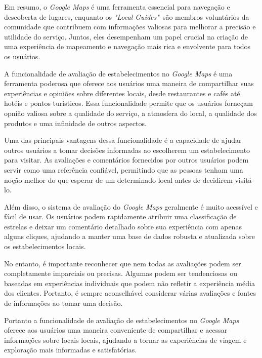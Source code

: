 Em resumo, o \textit{Google Maps} é uma ferramenta essencial para navegação e descoberta de lugares, enquanto os \textit{"Local Guides"}~são membros voluntários da comunidade que contribuem com informações valiosas para melhorar a precisão e utilidade do serviço. Juntos, eles desempenham um papel crucial na criação de uma experiência de mapeamento e navegação mais rica e envolvente para todos os usuários.



A funcionalidade de avaliação de estabelecimentos no \textit{Google Maps} é uma ferramenta poderosa que oferece aos usuários uma maneira de compartilhar suas experiências e opiniões sobre diferentes locais, desde restaurantes e cafés até hotéis e pontos turísticos. Essa funcionalidade permite que os usuários forneçam opnião valiosa sobre a qualidade do serviço, a atmosfera do local, a qualidade dos produtos e uma infinidade de outros aspectos.

Uma das principais vantagens dessa funcionalidade é a capacidade de ajudar outros usuários a tomar decisões informadas ao escolherem um estabelecimento para visitar. As avaliações e comentários fornecidos por outros usuários podem servir como uma referência confiável, permitindo que as pessoas tenham uma noção melhor do que esperar de um determinado local antes de decidirem visitá-lo.

Além disso, o sistema de avaliação do \textit{Google Maps} geralmente é muito acessível e fácil de usar. Os usuários podem rapidamente atribuir uma classificação de estrelas e deixar um comentário detalhado sobre sua experiência com apenas alguns cliques, ajudando a manter uma base de dados robusta e atualizada sobre os estabelecimentos locais.

No entanto, é importante reconhecer que nem todas as avaliações podem ser completamente imparciais ou precisas. Algumas podem ser tendenciosas ou baseadas em experiências individuais que podem não refletir a experiência média dos clientes. Portanto, é sempre aconselhável considerar várias avaliações e fontes de informações ao tomar uma decisão.

Portanto a funcionalidade de avaliação de estabelecimentos no \textit{Google Maps} oferece aos usuários uma maneira conveniente de compartilhar e acessar informações sobre locais locais, ajudando a tornar as experiências de viagem e exploração mais informadas e satisfatórias.

